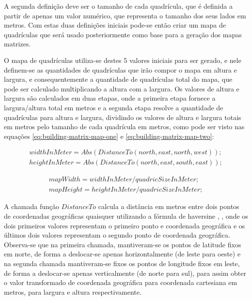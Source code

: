 A segunda definição deve ser o tamanho de cada quadrícula, que é definida a partir de apenas um valor numérico, que representa o tamanho dos seus lados em metros. Com estas duas definições iniciais pode-se então criar um mapa de quadrículas que será usado posteriormente como base para a geração dos mapas matrizes. 
	
O mapa de quadrículas utiliza-se destes 5 valores iniciais para ser gerado, e nele definem-se as quantidades de quadrículas que irão compor o mapa em altura e largura, e consequentemente a quantidade de quadrículas total do mapa, que pode ser calculado multiplicando a altura com a largura. Os valores de altura e largura são calculados em duas etapas, onde a primeira etapa fornece a largura/altura total em metros e a segunda etapa resolve a quantidade de quadrículas para altura e largura, dividindo os valores de altura e largura totais em metros pelo tamanho de cada quadrícula em metros, como pode ser visto nas equações \ref{eq:building-matrix-map-one} e \ref{eq:building-matrix-map-two}:

\begin{equation}
\label{eq:building-matrix-map-one}
\begin{split}
widthInMeter = Abs(DistanceTo(north, east, north, west));\\
heightInMeter = Abs(DistanceTo(north, east, south, east));
\end{split}
\end{equation}

\begin{equation}
\label{eq:building-matrix-map-two}
\begin{split}
mapWidth = widthInMeter / quadricSizeInMeter;\\
mapHeight = heightInMeter / quadricSizeInMeter;
\end{split}
\end{equation}

A chamada função \(DistanceTo\) calcula a distância em metros entre dois pontos de coordenadas geográficas quaisquer utilizando a fórmula de haversine \cite{shumaker1984astronomical}, \cite{snyder1987map}, onde os dois primeiros valores representam o primeiro ponto e coordenada geográfica e os últimos dois valores representam o segundo ponto de coordenada geográfica. Observa-se que na primeira chamada, mantiveram-se os pontos de latitude fixos em norte, de forma a deslocar-se apenas horizontalmente (de leste para oeste) e na segunda chamada mantiveram-se fixos os pontos de longitude fixos em leste, de forma a deslocar-se apenas verticalmente (de norte para sul), para assim obter o valor transformado de coordenada geográfica para coordenada cartesiana em metros, para largura e altura respectivamente.

